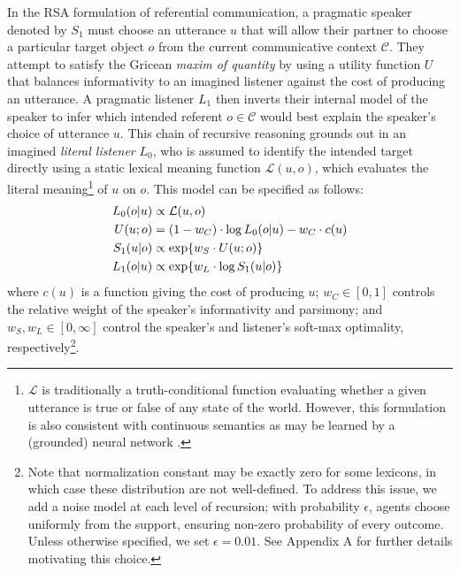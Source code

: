 In the RSA formulation of referential communication, a pragmatic speaker denoted by $S_1$ must choose an utterance $u$ that will allow their partner to choose a particular target object $o$ from the current communicative context $\mathcal{C}$. 
They attempt to satisfy the Gricean \emph{maxim of quantity} by using a utility function $U$ that balances informativity to an imagined listener against the cost of producing an utterance. 
A pragmatic listener $L_1$ then inverts their internal model of the speaker to infer which intended referent $o\in\mathcal{C}$ would best explain the speaker's choice of utterance $u$.
This chain of recursive reasoning grounds out in an imagined \emph{literal listener} $L_0$, who is assumed to identify the intended target directly using a static lexical meaning function $\mathcal{L}(u,o)$, which evaluates the literal meaning\footnote{$\mathcal{L}$ is traditionally a truth-conditional function evaluating whether a given utterance is true or false of any state of the world. However, this formulation is also consistent with continuous semantics \cite{degen2020redundancy} as may be learned by a (grounded) neural network \cite{potts2019case}.} of $u$ on $o$.
This model can be specified as follows:
\begin{align}
L_0(o | u) &\propto  \mathcal{L}(u,o)\hfill\label{eq:RSA}\\
U(u; o) & = (1-w_C) \cdot \log L_0(o | u) - w_C \cdot c(u) \nonumber \\
S_1(u | o) &\propto   \exp\{w_S \cdot U(u; o)\}\nonumber  \\
L_1(o | u) &\propto   \exp\{w_L \cdot \log S_1(u | o)\}\nonumber
\end{align}
where $c(u)$ is a function giving the cost of producing $u$; $w_C \in [0,1]$ controls the relative weight of the speaker's informativity and parsimony; and $w_S,w_L \in[0,\infty]$ control the speaker's and listener's soft-max optimality, respectively\footnote{Note that normalization constant may be exactly zero for some lexicons, in which case these distribution are not well-defined. To address this issue, we add a noise model at each level of recursion; with probability $\epsilon$, agents choose uniformly from the support, ensuring non-zero probability of every outcome. Unless otherwise specified, we set $\epsilon = 0.01$. See Appendix A for further details motivating this choice.}.

